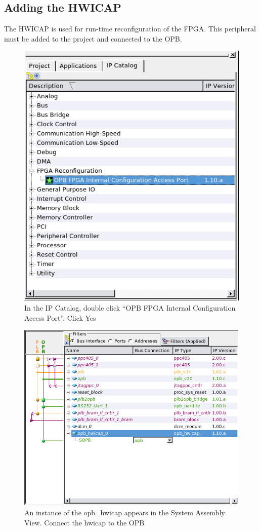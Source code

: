 \documentclass[a4paper,oneside]{memoir}
\begin{document}
\subsection{Adding the HWICAP}\label{sec:adding_hwicap}
The HWICAP is used for run-time reconfiguration of the FPGA. This peripheral must be added to the project and connected to the OPB.
\begin{figure}[H]
\centering
\includegraphics[scale=0.5]{HWICAP1}
\caption{In the IP Catalog, double click ``OPB FPGA Internal Configuration Access Port''. Click Yes\label{fig:HWICAP1}}
\end{figure}
\begin{figure}[H]
\centering
\includegraphics[scale=0.5]{HWICAP2}
\caption{An instance of the opb\_hwicap appears in the System Assembly View. Connect the hwicap to the OPB\label{fig:HWICAP2}}
\end{figure}
\end{document}
